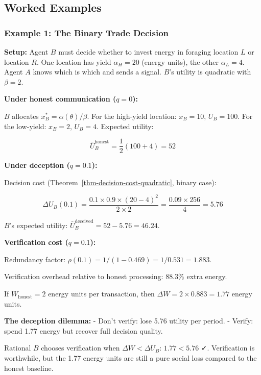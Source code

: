 \documentclass[11pt]{article}
\theoremstyle{plain}
\theoremstyle{definition}
\theoremstyle{remark}
\let\origsubsection\subsection
\renewcommand{\subsection}{\needspace{7\baselineskip}\origsubsection}
\let\origsubsubsection\subsubsection
\renewcommand{\subsubsection}{\needspace{4\baselineskip}\origsubsubsection}
\begin{document}
\subsection{Worked Examples}\label{worked-examples}

\subsubsection{Example 1: The Binary Trade
Decision}\label{example-1-the-binary-trade-decision}

\textbf{Setup:} Agent \(B\) must decide whether to invest energy in
foraging location \(L\) or location \(R\). One location has yield
\(\alpha_H = 20\) (energy units), the other \(\alpha_L = 4\). Agent
\(A\) knows which is which and sends a signal. \(B\)'s utility is
quadratic with \(\beta = 2\).

\textbf{Under honest communication (\(q = 0\)):}

\(B\) allocates \(x_B^* = \alpha(\theta)/\beta\). For the high-yield
location: \(x_B = 10\), \(U_B = 100\). For the low-yield: \(x_B = 2\),
\(U_B = 4\). Expected utility:

\[\bar{U}_B^{\text{honest}} = \frac{1}{2}(100 + 4) = 52\]

\textbf{Under deception (\(q = 0.1\)):}

Decision cost (Theorem~\ref{thm-decision-cost-quadratic}, binary case):

\[\Delta U_B(0.1) = \frac{0.1 \times 0.9 \times (20 - 4)^2}{2 \times 2} = \frac{0.09 \times 256}{4} = 5.76\]

\(B\)'s expected utility:
\(\bar{U}_B^{\text{deceived}} = 52 - 5.76 = 46.24\).

\textbf{Verification cost (\(q = 0.1\)):}

Redundancy factor: \(\rho(0.1) = 1/(1 - 0.469) = 1/0.531 = 1.883\).

Verification overhead relative to honest processing: \(88.3\%\) extra
energy.

If \(W_{\text{honest}} = 2\) energy units per transaction, then
\(\Delta W = 2 \times 0.883 = 1.77\) energy units.

\textbf{The deception dilemma:} - Don't verify: lose 5.76 utility per
period. - Verify: spend 1.77 energy but recover full decision quality.

Rational \(B\) chooses verification when \(\Delta W < \Delta U_B\):
\(1.77 < 5.76\) ✓. Verification is worthwhile, but the 1.77 energy units
are still a pure social loss compared to the honest baseline.
\end{document}
